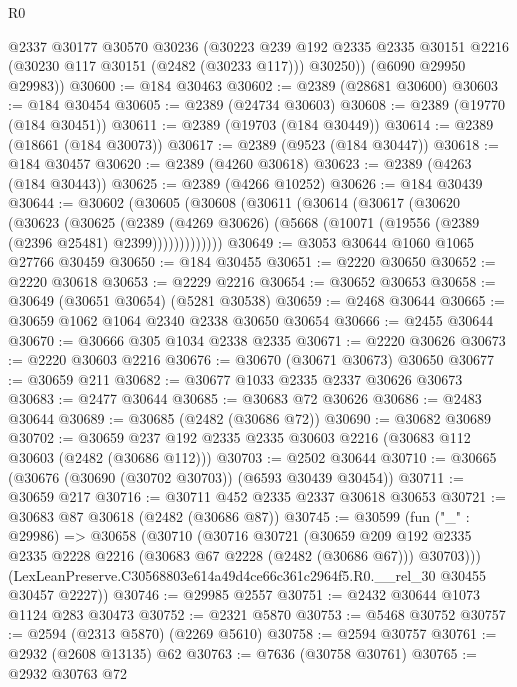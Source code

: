 \begin{lexlean}{R0}
\begin{coremodule}
        @2337
        @30177
        @30570
        @30236
        (@30223
          @239
          @192
          @2335
          @2335
          @30151
          @2216
          (@30230 @117 @30151 (@2482 (@30233 @117)))
          @30250))
      (@6090 @29950 @29983))
@30600 := @184 @30463
@30602 := @2389 (@28681 @30600)
@30603 := @184 @30454
@30605 := @2389 (@24734 @30603)
@30608 := @2389 (@19770 (@184 @30451))
@30611 := @2389 (@19703 (@184 @30449))
@30614 := @2389 (@18661 (@184 @30073))
@30617 := @2389 (@9523 (@184 @30447))
@30618 := @184 @30457
@30620 := @2389 (@4260 @30618)
@30623 := @2389 (@4263 (@184 @30443))
@30625 := @2389 (@4266 @10252)
@30626 := @184 @30439
@30644 := @30602
    (@30605
      (@30608
        (@30611
          (@30614
            (@30617
              (@30620
                (@30623
                  (@30625
                    (@2389
                      (@4269 @30626)
                      (@5668 (@10071 (@19556 (@2389 (@2396 @25481) @2399)))))))))))))
@30649 := @3053 @30644 @1060 @1065 @27766 @30459
@30650 := @184 @30455
@30651 := @2220 @30650
@30652 := @2220 @30618
@30653 := @2229 @2216
@30654 := @30652 @30653
@30658 := @30649 (@30651 @30654) (@5281 @30538)
@30659 := @2468 @30644
@30665 := @30659 @1062 @1064 @2340 @2338 @30650 @30654
@30666 := @2455 @30644
@30670 := @30666 @305 @1034 @2338 @2335
@30671 := @2220 @30626
@30673 := @2220 @30603 @2216
@30676 := @30670 (@30671 @30673) @30650
@30677 := @30659 @211
@30682 := @30677 @1033 @2335 @2337 @30626 @30673
@30683 := @2477 @30644
@30685 := @30683 @72 @30626
@30686 := @2483 @30644
@30689 := @30685 (@2482 (@30686 @72))
@30690 := @30682 @30689
@30702 := @30659 @237 @192 @2335 @2335 @30603 @2216 (@30683 @112 @30603 (@2482 (@30686 @112)))
@30703 := @2502 @30644
@30710 := @30665 (@30676 (@30690 (@30702 @30703)) (@6593 @30439 @30454))
@30711 := @30659 @217
@30716 := @30711 @452 @2335 @2337 @30618 @30653
@30721 := @30683 @87 @30618 (@2482 (@30686 @87))
@30745 := @30599
    (fun ("_" : @29986) =>
    @30658
      (@30710
        (@30716
          @30721
          (@30659
            @209
            @192
            @2335
            @2335
            @2228
            @2216
            (@30683 @67 @2228 (@2482 (@30686 @67)))
            @30703)))
      (LexLeanPreserve.C30568803e614a49d4ce66c361c2964f5.R0.__rel_30 @30455 @30457 @2227))
@30746 := @29985 @2557
@30751 := @2432 @30644 @1073 @1124 @283 @30473
@30752 := @2321 @5870
@30753 := @5468 @30752
@30757 := @2594 (@2313 @5870) (@2269 @5610)
@30758 := @2594 @30757
@30761 := @2932 (@2608 @13135) @62
@30763 := @7636 (@30758 @30761)
@30765 := @2932 @30763 @72

\end{coremodule}
\end{lexlean}
